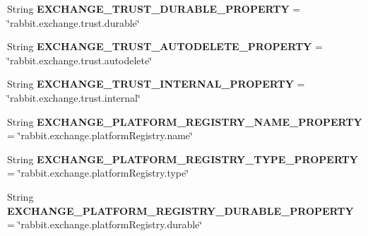 \begin{DoxyCompactItemize}
\item 
\mbox{\label{interfaceeu_1_1h2020_1_1symbiote_1_1util_1_1RabbitConstants_a7a00dd3b7f2bd74f5360b53ba5372448}} 
String {\bfseries E\+X\+C\+H\+A\+N\+G\+E\+\_\+\+T\+R\+U\+S\+T\+\_\+\+D\+U\+R\+A\+B\+L\+E\+\_\+\+P\+R\+O\+P\+E\+R\+TY} = \char`\"{}rabbit.\+exchange.\+trust.\+durable\char`\"{}
\item 
\mbox{\label{interfaceeu_1_1h2020_1_1symbiote_1_1util_1_1RabbitConstants_a8a0b44911b72a65a49f88795411855f1}} 
String {\bfseries E\+X\+C\+H\+A\+N\+G\+E\+\_\+\+T\+R\+U\+S\+T\+\_\+\+A\+U\+T\+O\+D\+E\+L\+E\+T\+E\+\_\+\+P\+R\+O\+P\+E\+R\+TY} = \char`\"{}rabbit.\+exchange.\+trust.\+autodelete\char`\"{}
\item 
\mbox{\label{interfaceeu_1_1h2020_1_1symbiote_1_1util_1_1RabbitConstants_a46ee4631d5fd18eae6d1f71785dfcca6}} 
String {\bfseries E\+X\+C\+H\+A\+N\+G\+E\+\_\+\+T\+R\+U\+S\+T\+\_\+\+I\+N\+T\+E\+R\+N\+A\+L\+\_\+\+P\+R\+O\+P\+E\+R\+TY} = \char`\"{}rabbit.\+exchange.\+trust.\+internal\char`\"{}
\item 
\mbox{\label{interfaceeu_1_1h2020_1_1symbiote_1_1util_1_1RabbitConstants_a185bc4c3766e69873eb003401bb5fae0}} 
String {\bfseries E\+X\+C\+H\+A\+N\+G\+E\+\_\+\+P\+L\+A\+T\+F\+O\+R\+M\+\_\+\+R\+E\+G\+I\+S\+T\+R\+Y\+\_\+\+N\+A\+M\+E\+\_\+\+P\+R\+O\+P\+E\+R\+TY} = \char`\"{}rabbit.\+exchange.\+platform\+Registry.\+name\char`\"{}
\item 
\mbox{\label{interfaceeu_1_1h2020_1_1symbiote_1_1util_1_1RabbitConstants_a6fb5f42052674e6cfe846db5c8186cb9}} 
String {\bfseries E\+X\+C\+H\+A\+N\+G\+E\+\_\+\+P\+L\+A\+T\+F\+O\+R\+M\+\_\+\+R\+E\+G\+I\+S\+T\+R\+Y\+\_\+\+T\+Y\+P\+E\+\_\+\+P\+R\+O\+P\+E\+R\+TY} = \char`\"{}rabbit.\+exchange.\+platform\+Registry.\+type\char`\"{}
\item 
\mbox{\label{interfaceeu_1_1h2020_1_1symbiote_1_1util_1_1RabbitConstants_ac50aba32ad6d86d8d021fa0e223a9578}} 
String {\bfseries E\+X\+C\+H\+A\+N\+G\+E\+\_\+\+P\+L\+A\+T\+F\+O\+R\+M\+\_\+\+R\+E\+G\+I\+S\+T\+R\+Y\+\_\+\+D\+U\+R\+A\+B\+L\+E\+\_\+\+P\+R\+O\+P\+E\+R\+TY} = \char`\"{}rabbit.\+exchange.\+platform\+Registry.\+durable\char`\"{}

\end{DoxyCompactItemize}
